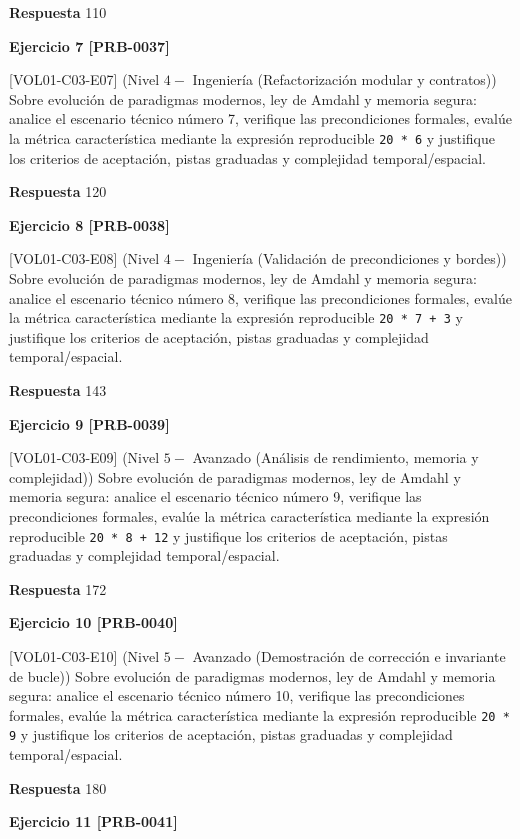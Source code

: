 \documentclass{book}
\begin{document}
\noindent\textbf{Respuesta} 110

\noindent\textbf{Ejercicio 7 [PRB-0037]}

[VOL01-C03-E07] (Nivel \(4 -\) Ingeniería (Refactorización modular y contratos)) Sobre evolución de paradigmas modernos, ley de Amdahl y memoria segura: analice el escenario técnico número 7, verifique las precondiciones formales, evalúe la métrica característica mediante la expresión reproducible \texttt{20 * 6} y justifique los criterios de aceptación, pistas graduadas y complejidad temporal/espacial.

\noindent\textbf{Respuesta} 120

\noindent\textbf{Ejercicio 8 [PRB-0038]}

[VOL01-C03-E08] (Nivel \(4 -\) Ingeniería (Validación de precondiciones y bordes)) Sobre evolución de paradigmas modernos, ley de Amdahl y memoria segura: analice el escenario técnico número 8, verifique las precondiciones formales, evalúe la métrica característica mediante la expresión reproducible \texttt{20 * 7 + 3} y justifique los criterios de aceptación, pistas graduadas y complejidad temporal/espacial.

\noindent\textbf{Respuesta} 143

\noindent\textbf{Ejercicio 9 [PRB-0039]}

[VOL01-C03-E09] (Nivel \(5 -\) Avanzado (Análisis de rendimiento, memoria y complejidad)) Sobre evolución de paradigmas modernos, ley de Amdahl y memoria segura: analice el escenario técnico número 9, verifique las precondiciones formales, evalúe la métrica característica mediante la expresión reproducible \texttt{20 * 8 + 12} y justifique los criterios de aceptación, pistas graduadas y complejidad temporal/espacial.

\noindent\textbf{Respuesta} 172

\noindent\textbf{Ejercicio 10 [PRB-0040]}

[VOL01-C03-E10] (Nivel \(5 -\) Avanzado (Demostración de corrección e invariante de bucle)) Sobre evolución de paradigmas modernos, ley de Amdahl y memoria segura: analice el escenario técnico número 10, verifique las precondiciones formales, evalúe la métrica característica mediante la expresión reproducible \texttt{20 * 9} y justifique los criterios de aceptación, pistas graduadas y complejidad temporal/espacial.

\noindent\textbf{Respuesta} 180

\noindent\textbf{Ejercicio 11 [PRB-0041]}
\end{document}

